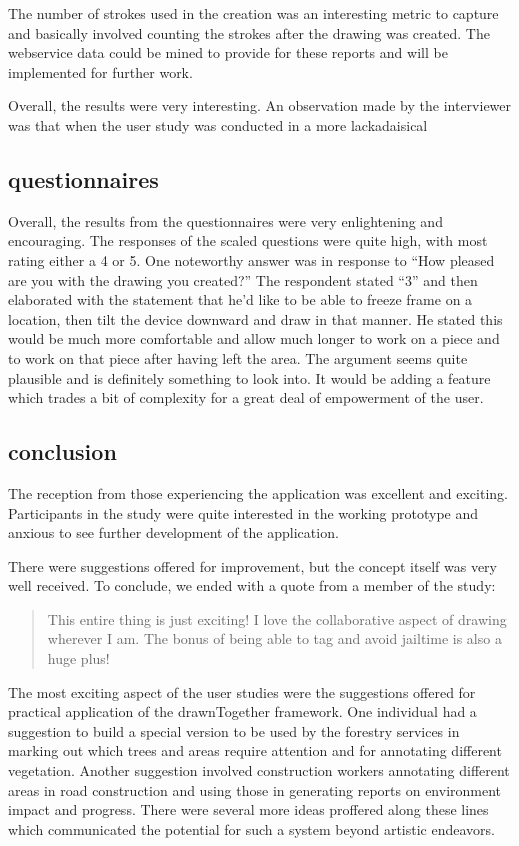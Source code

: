 \documentclass{chi2009}
\begin{document}
The number of strokes used in the creation was an interesting metric to capture
and basically involved counting the strokes after the drawing was created.  The
webservice data could be mined to provide for these reports and will be
implemented for further work.

Overall, the results were very interesting.  An observation made by the
interviewer was that when the user study was conducted in a more lackadaisical

\subsection{questionnaires}

Overall, the results from the questionnaires were very enlightening and
encouraging.   The responses of the scaled questions were quite high, with most
rating either a 4 or 5.  One noteworthy answer was in response to ``How pleased
are you with the drawing you created?'' The respondent stated ``3'' and then
elaborated with the statement that he'd like to be able to freeze frame on a
location, then tilt the device downward and draw in that manner.  He stated
this would be much more comfortable and allow much longer to work on a piece
and to work on that piece after having left the area.  The argument seems quite
plausible and is definitely something to look into.  It would be adding a
feature which trades a bit of complexity for a great deal of empowerment of the
user.

\subsection{conclusion}

The reception from those experiencing the application was excellent and
exciting.   Participants in the study were quite interested in the working
prototype and anxious to see further development of the application.

There were suggestions offered for improvement, but the concept itself was very
well received.  To conclude, we ended with a quote from a member of the study:

\begin{quote}
This entire thing is just exciting!  I love the collaborative aspect of drawing
wherever I am. The bonus of being able to tag and avoid jailtime is also a
huge plus!
\end{quote}

The most exciting aspect of the user studies were the suggestions offered for
practical application of the drawnTogether framework.  One individual had a
suggestion to build a special version to be used by the forestry services in
marking out which trees and areas require attention and for annotating
different vegetation.  Another suggestion involved construction workers
annotating different areas in road construction and using those in generating
reports on environment impact and progress.  There were several more ideas
proffered along these lines which communicated the potential for such a system
beyond artistic endeavors.
\end{document}
